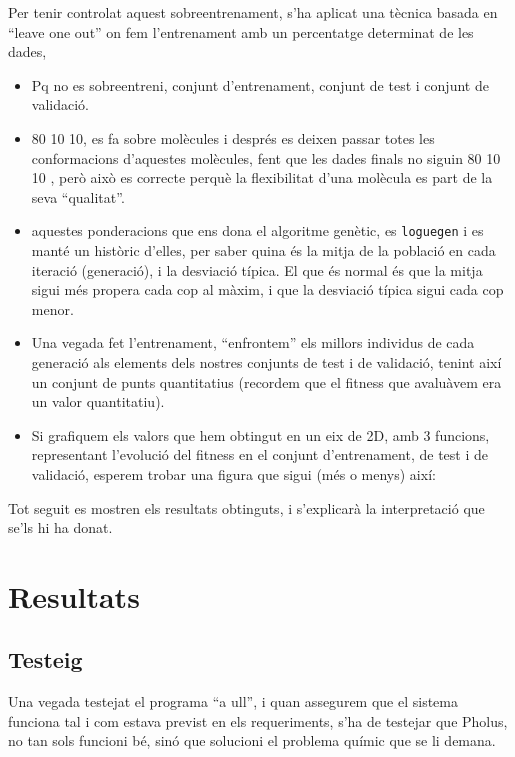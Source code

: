 Per tenir controlat aquest sobreentrenament, s'ha aplicat una tècnica basada en
``leave one out'' on fem l'entrenament amb un percentatge determinat de les
dades, 

\begin{itemize}
	\item Pq no es sobreentreni, conjunt d'entrenament, conjunt de test i conjunt
		de validació.
	\item 80 10 10, es fa sobre molècules i després es deixen passar totes les
		conformacions d'aquestes molècules, fent que les dades finals no siguin 80 10 10
		, però això es correcte perquè la flexibilitat d'una molècula es part de la seva
		``qualitat''.
	\item aquestes ponderacions que ens dona el algoritme genètic, es
		\texttt{loguegen} i es manté un històric d'elles, per saber quina és la mitja
		de la població en cada iteració (generació), i la desviació típica.  El que
		és normal és que la mitja sigui més propera cada cop al màxim, i que la
		desviació típica sigui cada cop menor.
	\item Una vegada fet l'entrenament, ``enfrontem'' els millors individus de
	cada generació als elements dels nostres conjunts de test i de validació,
	tenint així un conjunt de punts quantitatius (recordem que el fitness que
	avaluàvem era un valor quantitatiu).
	\item Si grafiquem els valors que hem obtingut en un eix de 2D, amb 3
	funcions, representant l'evolució del fitness en el conjunt d'entrenament, de
	test i de validació, esperem trobar una figura que sigui (més o menys) així:
\end{itemize}
 
Tot seguit es mostren els resultats obtinguts, i s'explicarà la interpretació
que se'ls hi ha donat.



\section{Resultats} %
\label{sec:Resultats}

\subsection{Testeig} %
\label{sub:Testeig}

Una vegada testejat el programa ``a ull'', i quan assegurem que el sistema
funciona tal i com estava previst en els requeriments, s'ha de testejar que
Pholus, no tan sols funcioni bé, sinó que solucioni el problema químic que se li
demana.

